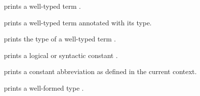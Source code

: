 \begin{isabellebody}
\begin{isamarkuptext}
\begin{description}
  \item {} prints a well-typed term .

  \item {} prints a well-typed term 
  annotated with its type.

  \item {} prints the type of a well-typed term
  .

  \item {} prints a logical or syntactic constant
  .
  
  \item {} prints a constant abbreviation
   as defined in the current context.

  \item {} prints a well-formed type .


\end{description}
\end{isamarkuptext}
\end{isabellebody}
